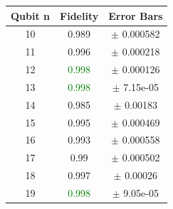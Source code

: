 \documentclass[9pt,a4paper]{src/templates/tau-class/tau}
\begin{document}
\begin{minipage}{0.48\textwidth}
\begin{minipage}[t]{0.48\linewidth}
\begin{center}
\begin{tabular}{@{}c c c@{}}
\bottomrule
\end{tabular}
\end{center}
\end{minipage}%
\hfill%
\begin{minipage}[t]{0.48\linewidth}
\begin{center}
\begin{tabular}{@{}c c c@{}}
\toprule
Qubit n & Fidelity & Error Bars \\ \midrule






















10 & 0.989 & $\pm$ 0.000582 \\



11 & 0.996 & $\pm$ 0.000218 \\



12 & \textcolor{green}{0.998} & $\pm$ 0.000126 \\



13 & \textcolor{green}{0.998} & $\pm$ 7.15e-05 \\



14 & 0.985 & $\pm$ 0.00183 \\



15 & 0.995 & $\pm$ 0.000469 \\



16 & 0.993 & $\pm$ 0.000558 \\



17 & 0.99 & $\pm$ 0.000502 \\



18 & 0.997 & $\pm$ 0.00026 \\



19 & \textcolor{green}{0.998} & $\pm$ 9.05e-05 \\


\bottomrule
\end{tabular}
\end{center}
\end{minipage}
\end{minipage}
\end{document}
